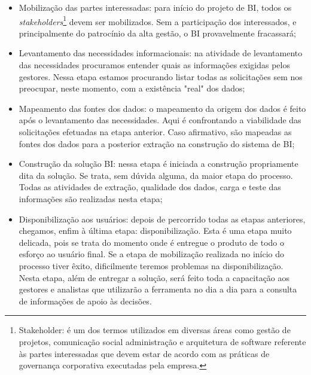 \begin{itemize}

    \item Mobiliza\c{c}\~{a}o das partes interessadas: para início do projeto de BI, todos os \textit{stakeholders}\footnote{Stakeholder: \'{e} um dos termos utilizados em diversas \'{a}reas como gest\~{a}o de projetos, comunica\c{c}\~{a}o social administra\c{c}\~{a}o e arquitetura de software referente \`{a}s partes interessadas que devem estar de acordo com as pr\'{a}ticas de governan\c{c}a corporativa executadas pela empresa.} devem ser mobilizados. Sem a participa\c{c}\~{a}o dos interessados, e principalmente do patrocínio da alta gest\~{a}o, o BI provavelmente fracassar\'{a};
    
    \item Levantamento das necessidades informacionais: na atividade de levantamento das necessidades procuramos entender quais as informa\c{c}ões exigidas pelos gestores. Nessa etapa estamos procurando listar todas as solicita\c{c}ões sem nos preocupar, neste momento, com a existência "real" dos dados;
    
    \item Mapeamento das fontes dos dados: o mapeamento da origem dos dados \'{e} feito após o levantamento das necessidades. Aqui \'{e} confrontando a viabilidade das solicita\c{c}ões efetuadas na etapa anterior. Caso afirmativo, s\~{a}o mapeadas as fontes dos dados para a posterior extra\c{c}\~{a}o na constru\c{c}\~{a}o do sistema de BI;
    
    \item Constru\c{c}\~{a}o da solu\c{c}\~{a}o BI: nessa etapa \'{e} iniciada a constru\c{c}\~{a}o propriamente dita da solu\c{c}\~{a}o. Se trata, sem dúvida alguma, da maior etapa do processo. Todas as atividades de extra\c{c}\~{a}o, qualidade dos dados, carga e teste das informa\c{c}ões s\~{a}o realizadas nesta etapa;
    
    \item Disponibiliza\c{c}\~{a}o aos usu\'{a}rios: depois de percorrido todas as etapas anteriores, chegamos, enfim \`{a} última etapa: disponibiliza\c{c}\~{a}o. Esta \'{e} uma etapa muito delicada, pois se trata do momento onde \'{e} entregue o produto de todo o esfor\c{c}o ao usu\'{a}rio final. Se a etapa de mobiliza\c{c}\~{a}o realizada no início do processo tiver êxito, dificilmente teremos problemas na disponibiliza\c{c}\~{a}o. Nesta etapa, al\'{e}m de entregar a solu\c{c}\~{a}o, ser\'{a} feito toda a capacita\c{c}\~{a}o aos gestores e analistas que utilizar\~{a}o a ferramenta no dia a dia para a consulta de informa\c{c}ões de apoio \`{a}s decisões.

\end{itemize}

